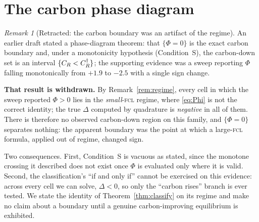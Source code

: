\documentclass[11pt,reqno]{amsart}
\theoremstyle{plain}
\theoremstyle{definition}
\theoremstyle{remark}
\newtheorem{remark}{Remark}
\theoremstyle{remark}\newtheorem{observation}{Observation}
\begin{document}
\section{The carbon phase diagram}\label{sec:phase}

\begin{remark}[Retracted: the carbon boundary was an artifact of the regime]
\label{rem:phaseretracted}
An earlier draft stated a phase-diagram theorem: that $\{\Phi=0\}$ is the exact carbon
boundary and, under a monotonicity hypothesis (Condition~S), the carbon-down set is an
interval $\{C_R<C_R^{\dagger}\}$; the supporting evidence was a sweep reporting $\Phi$
falling monotonically from $+1.9$ to $-2.5$ with a single sign change.

\textbf{That result is withdrawn.} By Remark~\ref{rem:regime}, every cell in which the
sweep reported $\Phi>0$ lies in the \emph{small}-\textsc{fcl} regime, where \eqref{eq:Phi}
is not the correct identity; the true $\Delta$ computed by quadrature is \emph{negative}
in all of them. There is therefore no observed carbon-down region on this family, and
$\{\Phi=0\}$ separates nothing: the apparent boundary was the point at which a
large-\textsc{fcl} formula, applied out of regime, changed sign.

Two consequences. First, Condition~S is vacuous as stated, since the monotone crossing it
described does not exist once $\Phi$ is evaluated only where it is valid. Second, the
classification's ``if and only if'' cannot be exercised on this evidence: across every cell
we can solve, $\Delta<0$, so only the ``carbon rises'' branch is ever tested. We state the
identity of Theorem~\ref{thm:classify} on its regime and make no claim about a boundary
until a genuine carbon-improving equilibrium is exhibited.
\end{remark}
\end{document}
